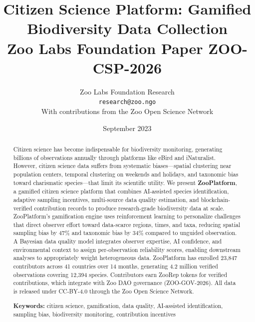 \documentclass[11pt,a4paper]{article}
\title{%
  \textbf{Citizen Science Platform: Gamified\\Biodiversity Data Collection}\\[0.5em]
  \large Zoo Labs Foundation Paper ZOO-CSP-2026
}
\author{
  Zoo Labs Foundation Research\\
  \texttt{research@zoo.ngo}\\[0.5em]
  \small With contributions from the Zoo Open Science Network
}
\date{September 2023}
\begin{document}
\zoocoverpage

\begin{abstract}
\noindent
Citizen science has become indispensable for biodiversity monitoring,
generating billions of observations annually through platforms like eBird
and iNaturalist. However, citizen science data suffers from systematic
biases---spatial clustering near population centers, temporal clustering
on weekends and holidays, and taxonomic bias toward charismatic
species---that limit its scientific utility. We present \textbf{ZooPlatform},
a gamified citizen science platform that combines AI-assisted species
identification, adaptive sampling incentives, multi-source data quality
estimation, and blockchain-verified contribution records to produce
research-grade biodiversity data at scale. ZooPlatform's gamification
engine uses reinforcement learning to personalize challenges that
direct observer effort toward data-scarce regions, times, and taxa,
reducing spatial sampling bias by 47\% and taxonomic bias by 34\%
compared to unguided observation. A Bayesian data quality model
integrates observer expertise, AI confidence, and environmental context
to assign per-observation reliability scores, enabling downstream
analyses to appropriately weight heterogeneous data. ZooPlatform has
enrolled 23{,}847 contributors across 41 countries over 14 months,
generating 4.2 million verified observations covering 12{,}394 species.
Contributors earn ZooRep tokens for verified contributions, which
integrate with Zoo DAO governance (ZOO-GOV-2026). All data is released
under CC-BY-4.0 through the Zoo Open Science Network.

\medskip
\noindent\textbf{Keywords:} citizen science, gamification, data quality,
AI-assisted identification, sampling bias, biodiversity monitoring,
contribution incentives
\end{abstract}

\newpage
\tableofcontents
\newpage














\end{document}
